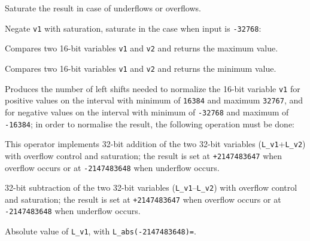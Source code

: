 
Saturate the result in case of underflows or overflows.


Negate {\tt v1} with saturation, saturate in the case when input is {\tt -32768}:


 

Compares two 16-bit variables {\tt v1} and {\tt v2} and returns the maximum value.

 

Compares two 16-bit variables {\tt v1} and {\tt v2} and returns the minimum value.


Produces the number of left shifts needed to normalize the 16-bit variable {\tt v1} for positive values on the interval with minimum of {\tt 16384} and maximum {\tt 32767}, and for negative values on the interval with minimum of {\tt -32768} and maximum of {\tt
-16384};
in order to normalise the result, the following operation must be done:



This operator implements 32-bit addition of the two 32-bit variables ({\tt L\_v1}+{\tt L\_v2}) with overflow control and saturation;
the result is set at {\tt +2147483647} when overflow occurs or at {\tt -2147483648} when underflow occurs.


32-bit subtraction of the two 32-bit variables ({\tt L\_v1}--{\tt L\_v2}) with overflow control and saturation;
the result is set at {\tt +2147483647} when overflow occurs or at {\tt -2147483648} when underflow occurs.


Absolute value of {\tt L\_v1}, with {\tt L\_abs(-2147483648)=}.

